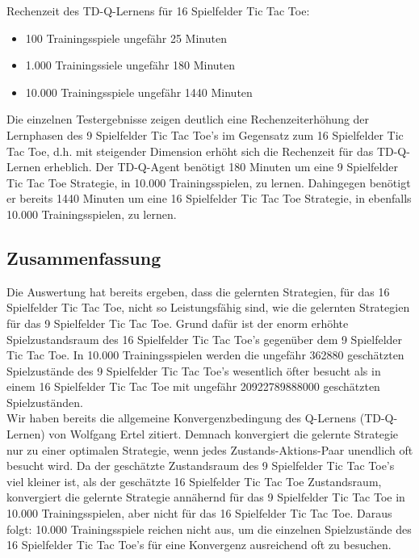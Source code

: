 Rechenzeit des TD-Q-Lernens für 16 Spielfelder Tic Tac Toe: 
\begin{itemize}
\item 100 Trainingsspiele ungefähr 25 Minuten
\item 1.000 Trainingssiele ungefähr 180 Minuten
\item 10.000 Trainingsspiele ungefähr 1440 Minuten
\end{itemize}

Die einzelnen Testergebnisse zeigen deutlich eine Rechenzeiterhöhung der Lernphasen des 9 Spielfelder Tic Tac Toe's im Gegensatz zum 16 Spielfelder Tic Tac Toe, d.h. mit steigender Dimension erhöht sich die Rechenzeit für das TD-Q-Lernen erheblich. Der TD-Q-Agent benötigt 180 Minuten um eine 9 Spielfelder Tic Tac Toe Strategie, in 10.000 Trainingsspielen, zu lernen. Dahingegen benötigt er bereits 1440 Minuten um eine 16 Spielfelder Tic Tac Toe Strategie, in ebenfalls 10.000 Trainingsspielen, zu lernen. \\

\subsection{Zusammenfassung}
Die Auswertung hat bereits ergeben, dass die gelernten Strategien, für das 16 Spielfelder Tic Tac Toe, nicht so Leistungsfähig sind, wie die gelernten Strategien für das 9 Spielfelder Tic Tac Toe. Grund dafür ist der enorm erhöhte Spielzustandsraum des 16 Spielfelder Tic Tac Toe's gegenüber dem 9 Spielfelder Tic Tac Toe. In 10.000 Trainingsspielen werden die ungefähr 362880 geschätzten Spielzustände des 9 Spielfelder Tic Tac Toe's wesentlich öfter besucht als in einem 16 Spielfelder Tic Tac Toe mit ungefähr 20922789888000 geschätzten Spielzuständen. \\

Wir haben bereits die allgemeine Konvergenzbedingung des Q-Lernens (TD-Q-Lernen) von Wolfgang Ertel zitiert. Demnach konvergiert die gelernte Strategie nur zu einer optimalen Strategie, wenn jedes Zustands-Aktions-Paar unendlich oft besucht wird. Da der geschätzte Zustandsraum des 9 Spielfelder Tic Tac Toe's viel kleiner ist, als der geschätzte 16 Spielfelder Tic Tac Toe Zustandsraum, konvergiert die gelernte Strategie annähernd für das 9 Spielfelder Tic Tac Toe in 10.000 Trainingsspielen, aber nicht für das 16 Spielfelder Tic Tac Toe. Daraus folgt: 10.000 Trainingsspiele reichen nicht aus, um die einzelnen Spielzustände des 16 Spielfelder Tic Tac Toe's für eine Konvergenz ausreichend oft zu besuchen. \\  


